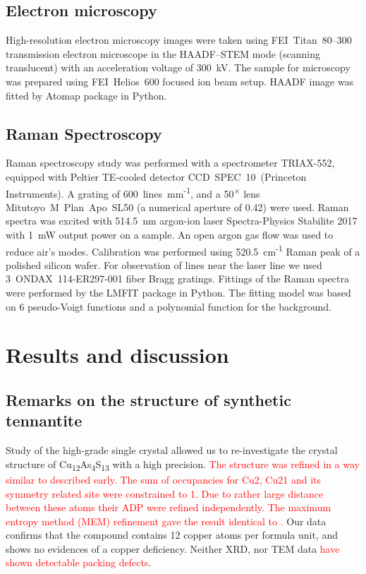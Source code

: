 \documentclass[preprint,review,12pt]{elsarticle}
\begin{document}
\subsection{Electron microscopy}\label{sec:level2}
High-resolution electron microscopy images were taken using FEI~Titan~80--300 transmission electron microscope in the HAADF--STEM mode (scanning translucent) with an acceleration voltage of 300~kV. The sample for microscopy was prepared using FEI~Helios~600 focused ion beam setup. HAADF image was fitted by Atomap\cite{Nord2017} package in Python.

\subsection{Raman Spectroscopy}\label{sec:level2}
Raman spectroscopy study was performed with a spectrometer TRIAX-552, equipped with Peltier TE-cooled detector CCD~SPEC~10~(Princeton Instruments).
A grating of 600~lines~mm\textsuperscript{-1}, and a 50\textsuperscript{$\times$} lens Mitutoyo~M~Plan~Apo~SL50 (a numerical aperture of 0.42) were used. Raman spectra was excited with 514.5~nm argon-ion laser Spectra-Physics Stabilite 2017 with 1~mW output power on a sample. An open argon gas flow was used to reduce air’s modes.
Calibration was performed using 520.5~cm\textsuperscript{-1} Raman peak of a polished silicon wafer. For observation of lines near the laser line we used 3~ONDAX~114-ER297-001 fiber Bragg gratings. Fittings of the Raman spectra were performed by the LMFIT\cite{LMFIT} package in Python. The fitting model was based on 6 pseudo-Voigt functions and a polynomial function for the background.

\section{Results and discussion}\label{sec:level1}

\subsection{Remarks on the structure of synthetic tennantite}\label{sec:level2}
Study of the high-grade single crystal allowed us to re-investigate the crystal structure of Cu\textsubscript{12}As\textsubscript{4}S\textsubscript{13}  with a high precision.
\textcolor{red}{The structure was refined in a way similar to described early\cite{yaroslavzev2019}.
The sum of occupancies for Cu2, Cu21 and its symmetry related site were constrained to 1.
Due to rather large distance between these atoms their ADP were refined independently.
The maximum entropy method (MEM) refinement gave the result identical to \cite{yaroslavzev2019}.}
Our data confirms that the compound contains 12 copper atoms per formula unit, and shows no evidences of a copper deficiency.
Neither XRD, nor TEM data \textcolor{red}{have shown detectable packing defects}.
\end{document}
